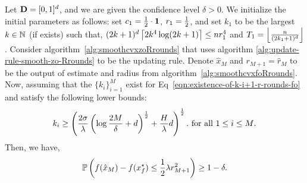 \begin{proposition}
\label{proposition:zeroth-order-smooth-r-rounds}
Let $\mathbf{D} = [0, 1]^d$, and we are given the confidence level $\delta > 0$. 
We initialize the initial parameters as follows: set $c_1 = \frac{1}{2} \cdot \mathbf{1}$, 
$r_1 = \frac{1}{2}$, and set $k_1$ to be the largest $k \in \mathbb{N}$ (if exists) such that, 
$(2k + 1)^d \left\lceil{2k^4 \log (2k+1)}\right\rceil \leq nr_1^4$ and $T_1 = \left\lfloor{\frac{n}{(2k_1 +1)^d}}\right\rfloor$.
Consider algorithm~\ref{alg:smoothcvxzoRrounds} that uses algorithm
\ref{alg:update-rule-smooth-zo-Rrounds} to be the updating rule. Denote 
$\hat{x}_M$ and $r_{M+1} = \hat{r}_M$ to be the output of estimate and radius
from algorithm~\ref{alg:smoothcvxfoRrounds}. Now, assuming that the 
$\{k_i\}_{i=1}^M$ exist for Eq~\eqref{eqn:existence-of-k-i+1-r-rounds-fo} 
and satisfy the following lower bounds: 
\begin{equation}
\label{eqn:lower-bound-on-k-i-zo}
k_i \geq \left(\frac{2\sigma}{\lambda} 
		\left(\log \frac{2M}{\delta} + d\right)^{\frac{1}{2}} + \frac{H}{\lambda}d\right)^{\frac{1}{2}}.
	~\text{for all $1\leq i\leq M$}. 
\end{equation}
Then, we have, 
\begin{equation*}
\mathbb{P}\left(f(\hat{x}_M) - f(x_f^\star) \leq \frac{1}{2} \lambda r_{M+1}^2\right)\geq 1-\delta. 
\end{equation*}
\end{proposition}

